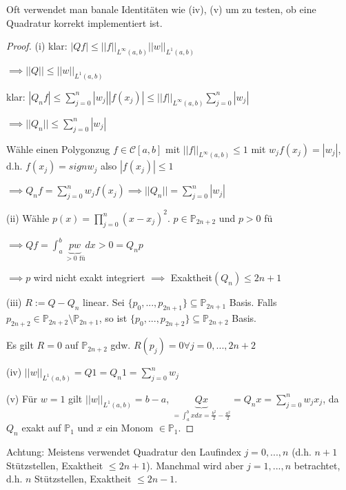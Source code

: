 \begin{remark}
	Oft verwendet man banale Identitäten wie (iv), (v) um zu testen, ob eine Quadratur korrekt implementiert ist.
\end{remark}

\begin{proof}
	(i) klar: $|Qf| \leq ||f||_{L^\infty(a,b)} ||w||_{L^1(a,b)}$
	
	$\implies ||Q|| \leq ||w||_{L^1(a,b)}$
	
	klar: $|Q_nf| \leq \sum_{j=0}^{n} |w_j| |f(x_j)| \leq ||f||_{L^\infty(a,b)} \sum_{j=0}^{n} |w_j|$
	
	$\implies ||Q_n|| \leq \sum_{j=0}^{n} |w_j|$
	
	Wähle einen Polygonzug $f \in \mathcal{C}[a,b]$ mit $||f||_{L^\infty(a,b)} \leq 1$ mit $w_j f(x_j) = |w_j|$, d.h. $f(x_j) = sign w_j$ also $|f(x_j)| \leq 1$
	
	$\implies Q_nf = \sum_{j=0}^{n} w_j f(x_j) \implies ||Q_n|| = \sum_{j=0}^{n} |w_j|$
	
	(ii) Wähle $p(x) = \prod_{j=0}^{n} (x-x_j)^2$. $p \in \mathbb{P}_{2n+2}$ und $p > 0$ fü
	
	$\implies Qf = \int_{a}^{b} \underbrace{p w}_{> 0 \text{ fü}} dx > 0 = Q_np$
	
	$\implies p$ wird nicht exakt integriert $\implies$ Exaktheit$(Q_n) \leq 2n+1$
	
	(iii) $R := Q - Q_n$ linear. Sei $\{p_0, ..., p_{2n+1}\} \subseteq \mathbb{P}_{2n+1}$ Basis. Falls $p_{2n+2} \in \mathbb{P}_{2n+2} \setminus \mathbb{P}_{2n+1}$, so ist $\{p_0, ..., p_{2n+2}\} \subseteq \mathbb{P}_{2n+2}$ Basis.
	
	Es gilt $R = 0$ auf $\mathbb{P}_{2n+2}$ gdw. $R(p_j) = 0 \forall j=0, ..., 2n+2$
	
	(iv) $||w||_{L^1(a,b)} = Q1 = Q_n1 = \sum_{j=0}^{n}w_j$
	
	(v) Für $w=1$ gilt $||w||_{L^1(a,b)} = b-a$, $\underbrace{Qx}_{=\int_{a}^{b}x dx = \frac{b^2}{2} - \frac{a^2}{2}} = Q_n x = \sum_{j=0}^{n} w_j x_j$, da $Q_n$ exakt auf $\mathbb{P}_{1}$ und $x$ ein Monom $\in \mathbb{P}_1$.
\end{proof}

Achtung: Meistens verwendet Quadratur den Laufindex $j=0, ..., n$ (d.h. $n+1$ Stützstellen, Exaktheit $\leq 2n+1$). Manchmal wird aber $j=1, ..., n$ betrachtet, d.h. $n$ Stützstellen, Exaktheit $\leq 2n-1$.

